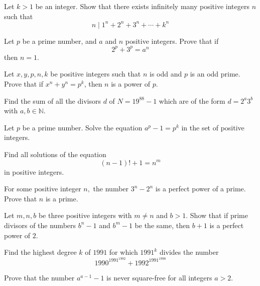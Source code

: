 \begin{problem}
	Let $k>1$ be an integer. Show that there exists infinitely many positive integers $n$ such that
	\[n \mid 1^n + 2^n +3^n +\cdots+k^n\]
\end{problem}


\begin{problem}[Ireland 1996]
	Let $p$ be a prime number, and $a$ and $n$ positive integers. Prove that if
	\[2^p+3^p=a^n\]
	then $n=1.$
\end{problem}



\begin{problem}[Russia 1996]
	Let $x, y, p, n, k$ be positive integers such that $n$ is odd and $p$ is an odd prime. Prove that if $x^n + y^n = p^k$, then $n$ is a power of $p$.
\end{problem}

\begin{problem}
	Find the sum of all the divisors $d$ of $N=19^{88}-1$ which are of the form $d=2^{a}3^{b}$ with  $a,b \in \mathbb N$.
\end{problem}

\begin{problem}
	Let $p$ be a prime number. Solve the equation $a^p-1 = p^k$ in the set of positive integers.
\end{problem}

\begin{problem}
	Find all solutions of the equation
	\[(n-1)! + 1 = n^m\]
	in positive integers.
\end{problem}

\begin{problem}[Bulgaria 1997]
	For some positive integer $n,$ the number $3^n-2^n$ is a perfect power of a prime. Prove that $n$ is a prime.
\end{problem}

\begin{problem}
	Let $m,n,b$ be three positive integers with $m \neq n$ and $b>1.$ Show that if prime divisors of the numbers $b^n-1$ and $b^m-1$ be the same, then $b+1$ is a perfect power of $2.$
\end{problem}

\begin{problem}
	Find the highest degree $ k$ of $ 1991$ for which $ 1991^k$ divides the number \[ 1990^{1991^{1992}} + 1992^{1991^{1990}}\]
\end{problem}

\begin{problem}
	Prove that the number $a^{a-1}-1$ is never square-free for all integers $a>2$.
\end{problem}

